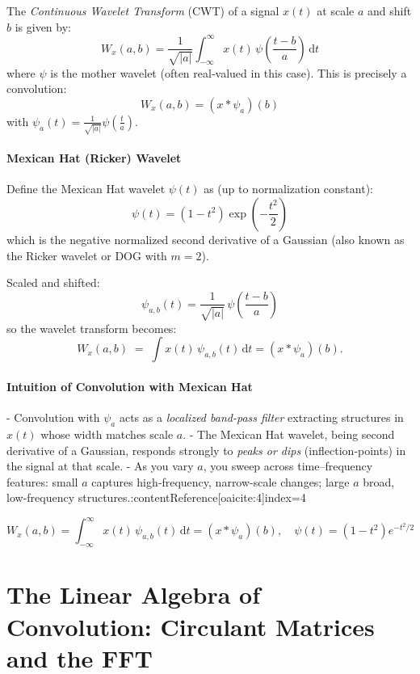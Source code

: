 \documentclass{article}
\begin{document}
The \emph{Continuous Wavelet Transform} (CWT) of a signal \(x(t)\) at scale \(a\) and shift \(b\) is given by:
\[
W_x(a,b) = \frac{1}{\sqrt{|a|}} \int_{-\infty}^{\infty} x(t)\,\psi\!\left(\frac{t-b}{a}\right)\,\mathrm{d}t
\]
where \(\psi\) is the mother wavelet (often real‐valued in this case). This is precisely a convolution:
\[
W_x(a,b) = (x * \psi_a)(b)
\]
with \(\psi_a(t) = \frac{1}{\sqrt{|a|}}\psi\left(\frac{t}{a}\right)\).


\paragraph{Mexican Hat (Ricker) Wavelet}

Define the Mexican Hat wavelet \(\psi(t)\) as (up to normalization constant):
\[
\psi(t) = \left(1 - t^2\right)\exp\!\left(-\frac{t^2}{2}\right)
\]
which is the negative normalized second derivative of a Gaussian (also known as the Ricker wavelet or DOG with \(m=2\)).

Scaled and shifted:
\[
\psi_{a,b}(t) = \frac{1}{\sqrt{|a|}}\,\psi\!\left(\frac{t - b}{a}\right)
\]
so the wavelet transform becomes:
\[
W_x(a,b) \;=\; \int x(t)\,\psi_{a,b}(t)\,\mathrm{d}t = (x * \psi_{a})(b).
\]

\paragraph{Intuition of Convolution with Mexican Hat}

- Convolution with \(\psi_{a}\) acts as a \emph{localized band-pass filter} extracting structures in \(x(t)\) whose width matches scale \(a\).
- The Mexican Hat wavelet, being second derivative of a Gaussian, responds strongly to \emph{peaks or dips} (inflection‐points) in the signal at that scale.
- As you vary \(a\), you sweep across time–frequency features: small \(a\) captures high‐frequency, narrow-scale changes; large \(a\) broad, low‐frequency structures.:contentReference[oaicite:4]{index=4}


\[
W_x(a,b)
= \int_{-\infty}^\infty x(t)\,\psi_{a,b}(t)\,\mathrm{d}t
= (x * \psi_a)(b),
\quad
\psi(t) = (1 - t^2) e^{-t^2/2}
\]







\section{The Linear Algebra of Convolution: Circulant Matrices and the FFT}\label{app:circulant}
\end{document}
